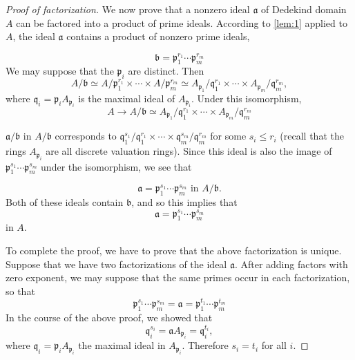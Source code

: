 \documentclass[12pt, oneside]{book}
\begin{document}
\begin{proof}
    [Proof of factorization]
    We now prove that a nonzero ideal $\mathfrak{a}$ of Dedekind domain $A$ can be factored into a product of prime ideals. According to \ref{lem:1} applied to $A$, the ideal $\mathfrak{a}$ contains a product of nonzero prime ideals,

    \begin{equation*}
        \mathfrak{b}=\mathfrak{p}_1^{r_1} \cdots \mathfrak{p}_m^{r_m}
    \end{equation*}
    We may suppose that the $\mathfrak{p}_i$ are distinct. Then
    \begin{equation*}
        A / \mathfrak{b} \simeq A / \mathfrak{p}_1^{r_1} \times \cdots \times A / \mathfrak{p}_m^{r_m} \simeq A_{\mathfrak{p}_1} / \mathfrak{q}_1^{r_1} \times \cdots \times A_{\mathfrak{p}_m} / \mathfrak{q}_m^{r_m},
    \end{equation*}
    where $\mathfrak{q}_i=\mathfrak{p}_i A_{\mathfrak{p}_i}$ is the maximal ideal of $A_{\mathfrak{p}_i}$.
    Under this isomorphism,
    \begin{equation*}
        A\rightarrow A / \mathfrak{b} \simeq A_{\mathfrak{p}_1} / \mathfrak{q}_1^{r_1} \times \cdots \times A_{\mathfrak{p}_m} / \mathfrak{q}_m^{r_m}
    \end{equation*}

    $\mathfrak{a} / \mathfrak{b}$ in $A/\mathfrak{b}$ corresponds to $\mathfrak{q}_1^{s_1} / \mathfrak{q}_1^{r_1} \times \cdots \times \mathfrak{q}_m^{s_m} / \mathfrak{q}_m^{r_m}$ for some $s_i \leq r_i$ (recall that the rings $A_{\mathfrak{p}_i}$ are all discrete valuation rings). Since this ideal is also the image of $\mathfrak{p}_1^{s_1} \cdots \mathfrak{p}_m^{s_m}$ under the isomorphism, we see that

    \begin{equation*}
        \mathfrak{a}=\mathfrak{p}_1^{s_1} \cdots \mathfrak{p}_m^{s_m} \text { in } A / \mathfrak{b} .
    \end{equation*}
    Both of these ideals contain $\mathfrak{b}$, and so this implies that
    \begin{equation*}
        \mathfrak{a}=\mathfrak{p}_1^{s_1} \cdots \mathfrak{p}_m^{s_m}
    \end{equation*}
    in $A$.

    To complete the proof, we have to prove that the above factorization is unique. Suppose that we have two factorizations of the ideal $\mathfrak{a}$. After adding factors with zero exponent, we may suppose that the same primes occur in each factorization, so that
    \begin{equation*}
        \mathfrak{p}_1^{s_1} \cdots \mathfrak{p}_m^{s_m}=\mathfrak{a}=\mathfrak{p}_1^{t_1} \cdots \mathfrak{p}_m^{t_m}
    \end{equation*}
    In the course of the above proof, we showed that
    \begin{equation*}
        \mathfrak{q}_i^{s_i}=\mathfrak{a} A_{\mathfrak{p}_i}=\mathfrak{q}_i^{t_i},
    \end{equation*}
    where $\mathfrak{q}_i=\mathfrak{p}_iA_{\mathfrak{p}_i}$ the maximal ideal in $A_{\mathfrak{p}_i}$. Therefore $s_i=t_i$ for all $i$.
\end{proof}
\end{document}
